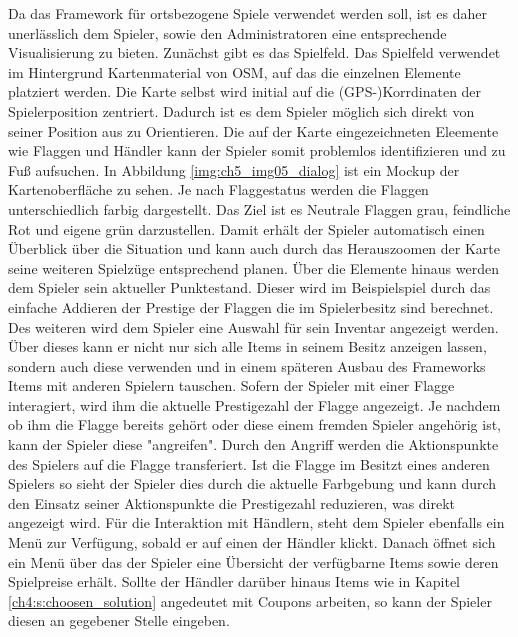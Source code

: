 Da das Framework für ortsbezogene Spiele verwendet werden soll, ist es daher unerlässlich dem Spieler, sowie den Administratoren eine entsprechende Visualisierung zu bieten. Zunächst gibt es das Spielfeld. Das Spielfeld verwendet im Hintergrund Kartenmaterial von OSM, auf das die einzelnen Elemente platziert werden. Die Karte selbst wird initial auf die (GPS-)Korrdinaten der Spielerposition zentriert. Dadurch ist es dem Spieler möglich sich direkt von seiner Position aus zu Orientieren. Die auf der Karte eingezeichneten Eleemente wie Flaggen und Händler kann der Spieler somit problemlos identifizieren und zu Fuß aufsuchen. In Abbildung \ref{img:ch5_img05_dialog} ist ein Mockup der Kartenoberfläche zu sehen. Je nach Flaggestatus werden die Flaggen unterschiedlich farbig dargestellt. Das Ziel ist es Neutrale Flaggen grau, feindliche Rot und eigene grün darzustellen. Damit erhält der Spieler automatisch einen Überblick über die Situation und kann auch durch das Herauszoomen der Karte seine weiteren Spielzüge entsprechend planen.
Über die Elemente hinaus werden dem Spieler sein aktueller Punktestand. Dieser wird im Beispielspiel durch das einfache Addieren der Prestige der Flaggen die im Spielerbesitz sind berechnet. Des weiteren wird dem Spieler eine Auswahl für sein Inventar angezeigt werden. Über dieses kann er nicht nur sich alle Items in seinem Besitz anzeigen lassen, sondern auch diese verwenden und in einem späteren Ausbau des Frameworks Items mit anderen Spielern tauschen.
Sofern der Spieler mit einer Flagge interagiert, wird ihm die aktuelle Prestigezahl der Flagge angezeigt. Je nachdem ob ihm die Flagge bereits gehört oder diese einem fremden Spieler angehörig ist, kann der Spieler diese "angreifen". Durch den Angriff werden die Aktionspunkte des Spielers auf die Flagge transferiert. Ist die Flagge im Besitzt eines anderen Spielers so sieht der Spieler dies durch die aktuelle Farbgebung und kann durch den Einsatz seiner Aktionspunkte die Prestigezahl reduzieren, was direkt angezeigt wird. Für die Interaktion mit Händlern, steht dem Spieler ebenfalls ein Menü zur Verfügung, sobald er auf einen der Händler klickt. Danach öffnet sich ein Menü über das der Spieler eine Übersicht der verfügbarne Items sowie deren Spielpreise erhält. Sollte der Händler darüber hinaus Items wie in Kapitel \ref{ch4:s:choosen_solution} angedeutet mit Coupons arbeiten, so kann der Spieler diesen an gegebener Stelle eingeben.

